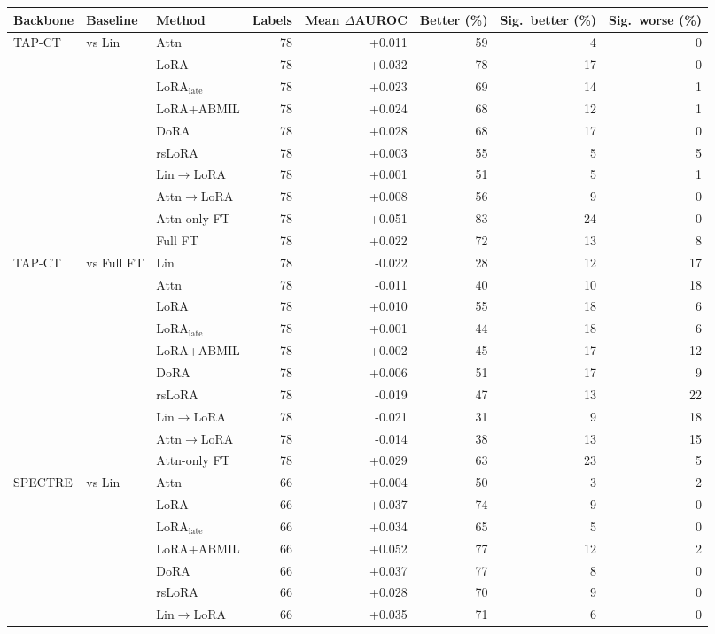 \begin{tabular}{lllrrrrr}
\toprule
Backbone & Baseline & Method & Labels & Mean $\Delta$AUROC & Better (\%) & Sig.\ better (\%) & Sig.\ worse (\%) \\
\midrule
TAP-CT & vs Lin & Attn & 78 & +0.011 & 59 & 4 & 0 \\
 &  & LoRA & 78 & +0.032 & 78 & 17 & 0 \\
 &  & LoRA$_{\text{late}}$ & 78 & +0.023 & 69 & 14 & 1 \\
 &  & LoRA+ABMIL & 78 & +0.024 & 68 & 12 & 1 \\
 &  & DoRA & 78 & +0.028 & 68 & 17 & 0 \\
 &  & rsLoRA & 78 & +0.003 & 55 & 5 & 5 \\
 &  & Lin$\to$LoRA & 78 & +0.001 & 51 & 5 & 1 \\
 &  & Attn$\to$LoRA & 78 & +0.008 & 56 & 9 & 0 \\
 &  & Attn-only FT & 78 & +0.051 & 83 & 24 & 0 \\
 &  & Full FT & 78 & +0.022 & 72 & 13 & 8 \\
\addlinespace[2pt]
TAP-CT & vs Full FT & Lin & 78 & -0.022 & 28 & 12 & 17 \\
 &  & Attn & 78 & -0.011 & 40 & 10 & 18 \\
 &  & LoRA & 78 & +0.010 & 55 & 18 & 6 \\
 &  & LoRA$_{\text{late}}$ & 78 & +0.001 & 44 & 18 & 6 \\
 &  & LoRA+ABMIL & 78 & +0.002 & 45 & 17 & 12 \\
 &  & DoRA & 78 & +0.006 & 51 & 17 & 9 \\
 &  & rsLoRA & 78 & -0.019 & 47 & 13 & 22 \\
 &  & Lin$\to$LoRA & 78 & -0.021 & 31 & 9 & 18 \\
 &  & Attn$\to$LoRA & 78 & -0.014 & 38 & 13 & 15 \\
 &  & Attn-only FT & 78 & +0.029 & 63 & 23 & 5 \\
\addlinespace[2pt]
SPECTRE & vs Lin & Attn & 66 & +0.004 & 50 & 3 & 2 \\
 &  & LoRA & 66 & +0.037 & 74 & 9 & 0 \\
 &  & LoRA$_{\text{late}}$ & 66 & +0.034 & 65 & 5 & 0 \\
 &  & LoRA+ABMIL & 66 & +0.052 & 77 & 12 & 2 \\
 &  & DoRA & 66 & +0.037 & 77 & 8 & 0 \\
 &  & rsLoRA & 66 & +0.028 & 70 & 9 & 0 \\
 &  & Lin$\to$LoRA & 66 & +0.035 & 71 & 6 & 0 \\

\end{tabular}
